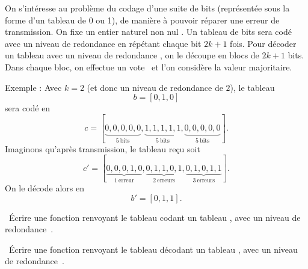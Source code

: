 On s'intéresse au problème du codage d'une suite de bits (représentée sous la forme d'un tableau de 0 ou 1), de manière à pouvoir réparer une erreur de transmission. 
On fixe un entier naturel non nul .
Un tableau de bits  sera codé avec un niveau de redondance  en répétant chaque bit $2k+1$ fois. 
Pour décoder un tableau avec un niveau de redondance , on le découpe en blocs de $2k+1$ bits. Dans chaque bloc, on effectue un \og vote \fg\ et l'on considère la valeur majoritaire. 

Exemple : Avec $k = 2$ (et donc un niveau de redondance de $2$), le tableau 
\begin{equation*}
  b = [0,1,0]
\end{equation*}
sera codé en 
\begin{equation*}
  c = [\underbrace{0,0,0,0,0}_{5~\textrm{bits}},\underbrace{1,1,1,1,1}_{5~\textrm{bits}},\underbrace{0,0,0,0,0}_{5~\textrm{bits}}].
\end{equation*}
Imaginons qu'après transmission, le tableau reçu soit 
\begin{equation*}
  c' = [\underbrace{0,0,0,1,0}_{1~\textrm{erreur}},\underbrace{0,1,1,0,1}_{2~\textrm{erreurs}},\underbrace{0,1,0,1,1}_{3~\textrm{erreurs}}].
\end{equation*}
On le décode alors en 
\begin{equation*}
  b' = [0,1,1].
\end{equation*}

\question\ Écrire une fonction  renvoyant le tableau codant un tableau , avec un niveau de redondance~. 

\question\ Écrire une fonction  renvoyant le tableau décodant un tableau , avec un niveau de redondance~. 



